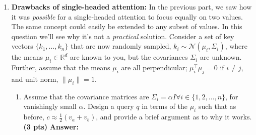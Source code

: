 \documentclass{assignment format}
\newenvironment{answer}{
    {\bf Answer:} \begingroup\color{red}
}{\endgroup}%
\begin{document}
\begin{enumerate}[label=(\alph*)]
\begin{enumerate}[label=(\roman*)]
\item As before, let $v_a$ and $v_b$ be two value vectors corresponding to key vectors $k_a$ and $k_b$, respectively.
Assume that (1) all key vectors are orthogonal, so $k_i^\top k_j = 0$ for all $i \neq j$; and (2) all key vectors have norm $1$.\footnote{Recall that a vector $x$ has norm 1 iff $x^\top x = 1$.}
\textbf{Find an expression} for a query vector $q$ such that $c \approx \frac{1}{2}(v_a + v_b)$. \newline \textbf{(HINT: } while the softmax function will never \textit{exactly} average the two vectors, you can get close by using a large scalar multiple in the expression.) \textbf{(3 pts)}
\begin{answer}
\end{answer}
\end{enumerate}

\item\textbf{Drawbacks of single-headed attention:} \label{q_problem_with_single_head}
In the previous part, we saw how it was \textit{possible} for a single-headed attention to focus equally on two values.
The same concept could easily be extended to any subset of values.
In this question we'll see why it's not a \textit{practical} solution.
Consider a set of key vectors $\{k_1,\dots,k_n\}$ that are now randomly sampled, $k_i\sim \mathcal{N}(\mu_i, \Sigma_i)$, where the means $\mu_i \in \mathbb{R}^d$ are known to you, but the covariances $\Sigma_i$ are unknown.
Further, assume that the means $\mu_i$ are all perpendicular; $\mu_i^\top \mu_j = 0$ if $i\not=j$, and unit norm, $\|\mu_i\|=1$.

\begin{enumerate}[label=(\roman*)]
\item Assume that the covariance matrices are $\Sigma_i = \alpha I \forall i \in \{1, 2, \ldots, n\}$, for vanishingly small $\alpha$.
Design a query $q$ in terms of the $\mu_i$ such that as before, $c\approx \frac{1}{2}(v_a + v_b)$, and provide a brief argument as to why it works. \textbf{(3 pts)}
\begin{answer}
\end{answer}


\end{enumerate}
\end{enumerate}
\end{document}
